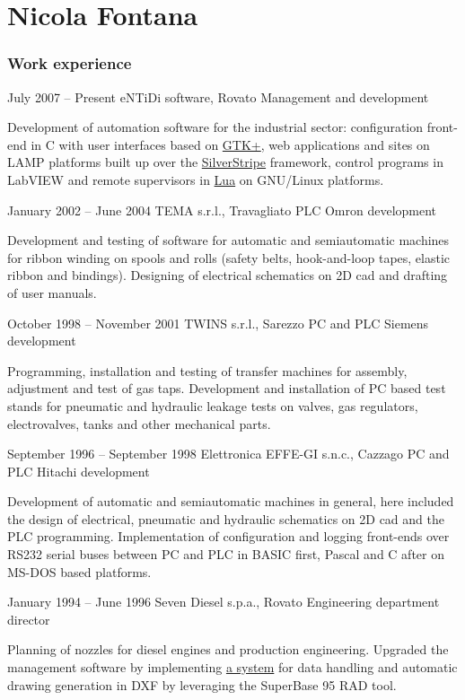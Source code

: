 \documentclass[fontsize=10pt]{tccv}
\begin{document}
\part{Nicola Fontana}

\section{Work experience}

\begin{eventlist}

\item{July 2007 -- Present}
     {eNTiDi software, Rovato}
     {Management and development}

Development of automation software for the industrial sector:
configuration front-end in C with user interfaces based on
\href{http://www.gtk.org/}{GTK+}, web applications and sites
on LAMP platforms built up over the
\href{http://www.silverstripe.org/}{SilverStripe} framework,
control programs in LabVIEW and remote supervisors in
\href{http://www.lua.org/}{Lua} on GNU/Linux platforms.

\item{January 2002 -- June 2004}
     {TEMA s.r.l., Travagliato}
     {PLC Omron development}

Development and testing of software for automatic and semiautomatic
machines for ribbon winding on spools and rolls (safety belts,
hook-and-loop tapes, elastic ribbon and bindings). Designing of
electrical schematics on 2D cad and drafting of user manuals.

\item{October 1998 -- November 2001}
     {TWINS s.r.l., Sarezzo}
     {PC and PLC Siemens development}

Programming, installation and testing of transfer machines for assembly,
adjustment and test of gas taps. Development and installation of PC
based test stands for pneumatic and hydraulic leakage tests on valves,
gas regulators, electrovalves, tanks and other mechanical parts.

\item{September 1996 -- September 1998}
     {Elettronica EFFE-GI s.n.c., Cazzago}
     {PC and PLC Hitachi development}

Development of automatic and semiautomatic machines in general, here
included the design of electrical, pneumatic and hydraulic schematics on
2D cad and the PLC programming. Implementation of configuration and
logging front-ends over RS232 serial buses between PC and PLC in BASIC
first, Pascal and C after on MS-DOS based platforms.

\item{January 1994 -- June 1996}
     {Seven Diesel s.p.a., Rovato}
     {Engineering department director}

Planning of nozzles for diesel engines and production engineering.
Upgraded the management software by implementing
\href{http://adg.entidi.com/home/history/}{a system} for data handling
and automatic drawing generation in DXF by leveraging the SuperBase 95
RAD tool.

\end{eventlist}
\end{document}
